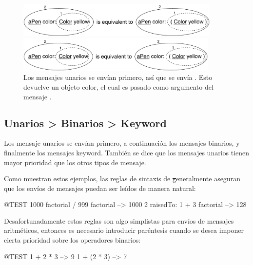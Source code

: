 \documentclass[a4paper,10pt,twoside]{book}
\begin{document}
\begin{figure}[ht]
\ifluluelse
	{\centerline{\includegraphics[width=0.9\textwidth]{uKeyUn}} }
	{\centerline{\includegraphics[width=10cm]{uKeyUn}} }
\caption{Los mensajes unarios se env\'ian primero, as\'i que se env\'ia . Esto devuelve un objeto color, el cual es pasado como argumento del mensaje .}
\end{figure}

\subsection*{Unarios > Binarios > Keyword}
Los mensaje unarios se env\'ian primero, a continuaci\'on los mensajes binarios, y finalmente los mensajes keyword. Tambi\'en se dice que los mensajes unarios tienen mayor prioridad que los otros tipos de mensaje.


Como muestran estos ejemplos, las reglas de sintaxis de \st generalmente aseguran que los env\'ios de mensajes puedan ser le\'idos de manera natural:
\begin{code}{@TEST}
1000 factorial / 999 factorial --> 1000
2 raisedTo: 1 + 3 factorial     --> 128
\end{code}
\noindent

Desafortunadamente estas reglas son algo simplistas para env\'ios de mensajes aritm\'eticos, entonces es necesario introducir par\'entesis cuando se desea imponer cierta prioridad sobre los operadores binarios:
\begin{code}{@TEST}
1 + 2 * 3   --> 9
1 + (2 * 3) --> 7
\end{code}
\end{document}
